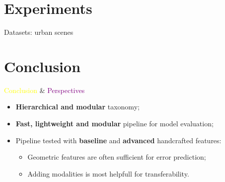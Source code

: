 \documentclass[10pt]{beamer}
\begin{document}
    \section{Experiments}
        \begin{frame}{Datasets: urban scenes}
            \centering
            
        \end{frame}
        
    \section{Conclusion}
        \begin{frame}{\textcolor{yellow}{Conclusion} \& \textcolor{purple}{Perspectives}}
            \begin{itemize}[label=\(\blacktriangleright\), font=\color{yellow}, itemsep=2em]
                \item<1-> \textbf{Hierarchical and modular} taxonomy;
                \item<2-> \textbf{Fast, lightweight and modular} pipeline for model evaluation;
                \item<3-> Pipeline tested with \textbf{baseline} and \textbf{advanced} handcrafted features:
                    \begin{itemize}[label=\(\blacktriangleright\), font=\color{IGNGreen}]
                        \item<4-> Geometric features are often sufficient for error prediction;
                        \item<5-> Adding modalities is most helpfull for transferability.
                    \end{itemize}
            \end{itemize}
        \end{frame}
\end{document}
